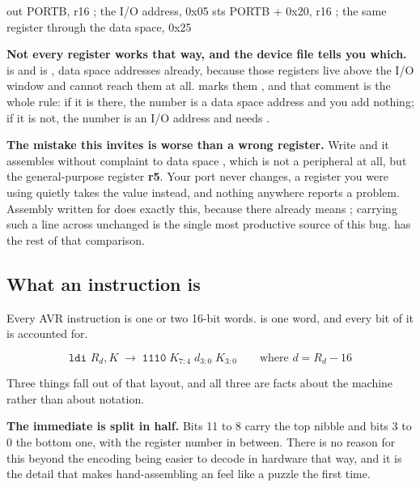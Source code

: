 \begin{asm}
out PORTB, r16              ; the I/O address, 0x05
sts PORTB + 0x20, r16       ; the same register through the data space, 0x25
\end{asm}

\textbf{Not every register works that way, and the device file tells you which.}  is
 and  is , data space addresses already, because those
registers live above the I/O window and  cannot reach them at all.
 marks them , and that comment is the whole rule: if it
is there, the number is a data space address and you add nothing; if it is not, the number is an
I/O address and  needs .

\textbf{The mistake this invites is worse than a wrong register.} Write  and
it assembles without complaint to data space , which is not a peripheral at all, but
the general-purpose register \textbf{r5}. Your port never changes, a register you were using
quietly takes the value instead, and nothing anywhere reports a problem. Assembly written for
 does exactly this, because there  already means ; carrying
such a line across unchanged is the single most productive source of this bug.
 has the rest of that comparison.

\subsection{What an instruction is}
\label{c1:sec:encoding}
Every AVR instruction is one or two 16-bit words.  is one word, and every bit of it is
accounted for.


\[
  \texttt{ldi }R_d, K \;\longrightarrow\; \texttt{1110}\;K_{7:4}\;d_{3:0}\;K_{3:0}
  \qquad\text{where } d = R_d - 16
\]

Three things fall out of that layout, and all three are facts about the machine rather than about
notation.

\textbf{The immediate is split in half.} Bits 11 to 8 carry the top nibble and bits 3 to 0 the
bottom one, with the register number in between. There is no reason for this beyond the encoding
being easier to decode in hardware that way, and it is the detail that makes hand-assembling an
 feel like a puzzle the first time.

